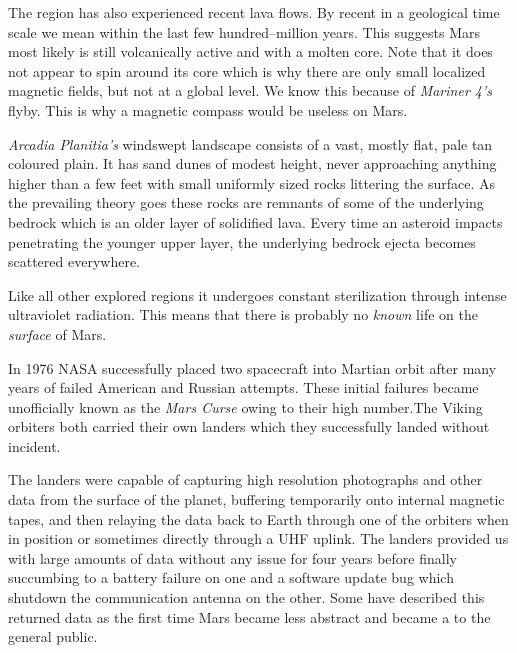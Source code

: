 The region has also experienced recent lava flows. By recent in a geological time scale we mean within the last few hundred--million years. This suggests Mars most likely is still volcanically active and with a molten core. Note that it does not appear to spin around its core which is why there are only small localized magnetic fields, but not at a global level. We know this because of {\it Mariner 4's} flyby. This is why a magnetic compass would be useless on Mars.

    {}
    {}
    {}
    \stopcombination

{\it Arcadia Planitia's} windswept landscape consists of a vast, mostly flat, pale tan coloured plain. It has sand dunes of modest height, never approaching anything higher than a few feet with small uniformly sized rocks littering the surface. As the prevailing theory goes these rocks are remnants of some of the underlying bedrock which is an older layer of solidified lava. Every time an asteroid impacts penetrating the younger upper layer, the underlying bedrock ejecta becomes scattered everywhere.

Like all other explored regions it undergoes constant sterilization through intense ultraviolet radiation. This means that there is probably no {\it known} life on the {\it surface} of Mars.

\page
{}

In 1976 NASA successfully placed two spacecraft into Martian orbit after many years of failed American and Russian attempts. These initial failures became unofficially known as the {\it Mars Curse} owing to their high number. The Viking orbiters both carried their own landers which they successfully landed without incident.

The landers were capable of capturing high resolution photographs and other data from the surface of the planet, buffering temporarily onto internal magnetic tapes, and then relaying the data back to Earth through one of the orbiters when in position or sometimes directly through a UHF uplink. The landers provided us with large amounts of data without any issue for four years before finally succumbing to a battery failure on one and a software update bug which shutdown the communication antenna on the other. Some have described this returned data as the first time Mars became less abstract and became a  to the general public.

